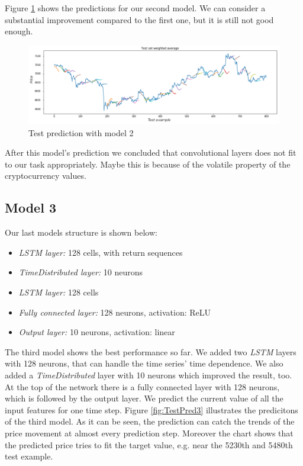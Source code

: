 \documentclass[conference]{IEEEtran}
\begin{document}
\vspace{3px}

Figure \ref{fig:TestPred2} shows the predictions for our second model. We can consider a substantial improvement compared to the first one, but it is still not good enough.

\begin{figure}[!ht]
  \centering
  \includegraphics[width=170mm, keepaspectratio]{figures/test_pred_2.png}
  \caption{Test prediction with model 2}
  \label{fig:TestPred2}
\end{figure}

After this model's prediction we concluded that convolutional layers does not fit to our task appropriately. Maybe this is because of the volatile property of the cryptocurrency values.

\subsection{Model 3}

Our last models structure is shown below:

\vspace{3px}

\begin{itemize}
  \item \textit{LSTM layer:} 128 cells, with return sequences
  \item \textit{TimeDistributed layer:} 10 neurons
  \item \textit{LSTM layer:} 128 cells
  \item \textit{Fully connected layer:} 128 neurons, activation: ReLU
  \item \textit{Output layer:} 10 neurons, activation: linear
\end{itemize}

\vspace{3px}

The third model shows the best performance so far. We added two \emph{LSTM} layers with 128 neurons, that can handle the time series' time dependence. We also added a \emph{TimeDistributed} layer with 10 neurons which improved the result, too. At the top of the network there is a fully connected layer with 128 neurons, which is followed by the output layer. We predict the current value of all the input features for one time step. Figure \ref{fig:TestPred3} illustrates the predicitons of the third model. As it can be seen, the prediction can catch the trends of the price movement at almost every prediction step. Moreover the chart shows that the predicted price tries to fit the target value, e.g. near the 5230th and 5480th test example.
\end{document}

